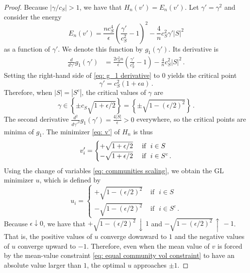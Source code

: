 \documentclass[10pt,a4paper]{amsart}
\def\ep{\epsilon}
\begin{document}
\begin{proof}
Because $\left|{\gamma}/{c_S}\right| > 1$, we have that $H_n(v') = E_n(v')$. Let $\gamma' = \gamma^2$ and consider the energy
\begin{equation}\label{eq: g_1}
    E_n(v') = \frac{n c_S^4}{\ep} \left(\frac{ \gamma'}{c_S^2} - 1\right)^2 - \frac{4}{n} c_S^2 \gamma' |S|^2
\end{equation}
as a function of $\gamma'$. We denote this function by $g_1(\gamma')$.
Its derivative is
\begin{align}\label{eq: g_1 derivative}
    \frac{d}{d\gamma'}g_1(\gamma') &=  \frac{2c_S^2 n}{\ep} \left(\frac{\gamma'}{c_S^2} - 1\right) - \frac{4}{n} c_S^2 |S|^2\,.
\end{align}
Setting {the right-hand side of} \eqref{eq: g_1 derivative} to $0$ yields the critical point
\begin{equation*}
    \gamma' = c_S^2 \left(1 + \ep a \right) \,.
\end{equation*} 
Therefore, when $|S| = |S^c|$, the {critical values of $\gamma$ are}
\begin{equation*}
    \gamma \in \left \{\pm c_S \sqrt{1 + \ep/2}\right\} = \left\{\pm \sqrt{1 - (\ep/2)^2}\right\}\,. 
\end{equation*} 
The second derivative $\frac{d^2}{d\gamma'^2}g_1(\gamma') = \frac{4|S|}{\ep} > 0$ everywhere, so the critical points are minima of $g_1$. The minimizer \eqref{eq: v'} of $H_n$ is thus
\begin{equation}
    v'_i = \begin{cases}
        +\sqrt{1+\ep/2} &\text{ if }\,\, i\in S 
        \\
        -\sqrt{1+\ep/2} &\text{ if \,\,} i\in S^c   \,.  
    \end{cases}
\end{equation}
Using the change of variables \eqref{eq: communities scaling}, we obtain the GL minimizer $u$, which is defined by 
\begin{equation}
    u_i = \begin{cases}
        +\sqrt{1 - (\ep/2)^2} &\text{ if }\,\, i\in S 
        \\
        -\sqrt{1 - (\ep/2)^2} &\text{ if }\,\, i\in S^c   \,. 
    \end{cases}
\end{equation}
Because $\ep \downarrow 0$, we have that $+\sqrt{1 - (\ep/2)^2} \, \downarrow \, 1$ and $-\sqrt{1 - (\ep/2)^2} \, \uparrow \, -1$. {That is, the positive values of $u$ converge downward to $1$ and the negative values {of $u$} converge upward to $-1$.} Therefore, even when the mean value of $v$ is forced by the {mean-value constraint} \eqref{eq: equal community vol constraint} to have an absolute value larger than $1$, the optimal $u$ approaches $\pm 1$. 



\end{proof}
\end{document}
